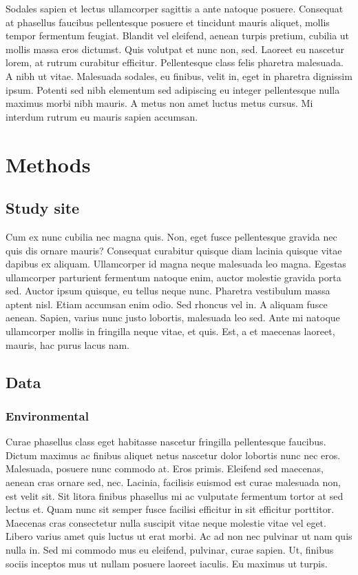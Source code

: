 \documentclass[
  11pt,
]{report}
\begin{document}
Sodales sapien et lectus ullamcorper sagittis a ante natoque posuere.
Consequat at phasellus faucibus pellentesque posuere et tincidunt mauris
aliquet, mollis tempor fermentum feugiat. Blandit vel eleifend, aenean
turpis pretium, cubilia ut mollis massa eros dictumst. Quis volutpat et
nunc non, sed. Laoreet eu nascetur lorem, at rutrum curabitur efficitur.
Pellentesque class felis pharetra malesuada. A nibh ut vitae. Malesuada
sodales, eu finibus, velit in, eget in pharetra dignissim ipsum. Potenti
sed nibh elementum sed adipiscing eu integer pellentesque nulla maximus
morbi nibh mauris. A metus non amet luctus metus cursus. Mi interdum
rutrum eu mauris sapien accumsan.

\hypertarget{methods}{%
\chapter{Methods}\label{methods}}

\hypertarget{study-site}{%
\section{Study site}\label{study-site}}

Cum ex nunc cubilia nec magna quis. Non, eget fusce pellentesque gravida
nec quis dis ornare mauris? Consequat curabitur quisque diam lacinia
quisque vitae dapibus ex aliquam. Ullamcorper id magna neque malesuada
leo magna. Egestas ullamcorper parturient fermentum natoque enim, auctor
molestie gravida porta sed. Auctor ipsum quisque, eu tellus neque nunc.
Pharetra vestibulum massa aptent nisl. Etiam accumsan enim odio. Sed
rhoncus vel in. A aliquam fusce aenean. Sapien, varius nunc justo
lobortis, malesuada leo sed. Ante mi natoque ullamcorper mollis in
fringilla neque vitae, et quis. Est, a et maecenas laoreet, mauris, hac
purus lacus nam.

\hypertarget{data}{%
\section{Data}\label{data}}

\hypertarget{environmental}{%
\subsection{Environmental}\label{environmental}}

Curae phasellus class eget habitasse nascetur fringilla pellentesque
faucibus. Dictum maximus ac finibus aliquet netus nascetur dolor
lobortis nunc nec eros. Malesuada, posuere nunc commodo at. Eros primis.
Eleifend sed maecenas, aenean cras ornare sed, nec. Lacinia, facilisis
euismod est curae malesuada non, est velit sit. Sit litora finibus
phasellus mi ac vulputate fermentum tortor at sed lectus et. Quam nunc
sit semper fusce facilisi efficitur in sit efficitur porttitor. Maecenas
cras consectetur nulla suscipit vitae neque molestie vitae vel eget.
Libero varius amet quis luctus ut erat morbi. Ac ad non nec pulvinar ut
nam quis nulla in. Sed mi commodo mus eu eleifend, pulvinar, curae
sapien. Ut, finibus sociis inceptos mus ut nullam posuere laoreet
iaculis. Eu maximus ut turpis.
\end{document}
